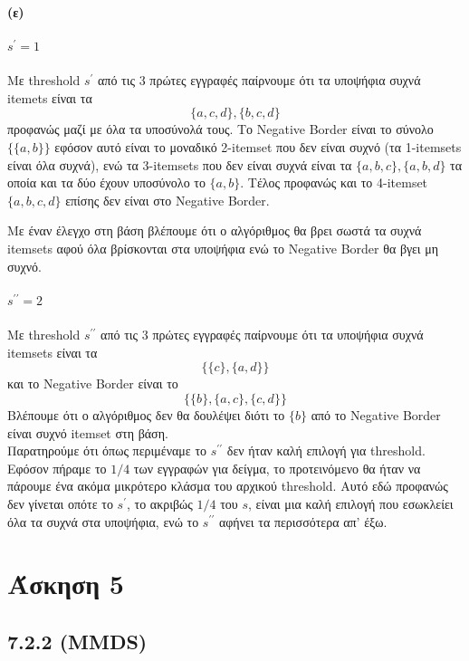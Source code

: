 \documentclass[a4paper,11pt]{article}
\begin{document}
\paragraph{(ε)}
\subparagraph{$s^\prime=1$} Με threshold $s^\prime$ από τις 3 πρώτες εγγραφές παίρνουμε ότι τα υποψήφια συχνά itemets είναι τα
\[ \{a,c,d\},\{b,c,d\} \]
προφανώς μαζί με όλα τα υποσύνολά τους.
Το Negative Border είναι το σύνολο $\{ \{a,b\} \}$ εφόσον αυτό είναι το μοναδικό 2-itemset που δεν είναι συχνό (τα 1-itemsets είναι όλα συχνά), ενώ τα 3-itemsets που δεν είναι συχνά είναι τα $\{a,b,c\},\{a,b,d\}$ τα οποία και τα δύο έχουν υποσύνολο το $\{a,b\}$.
Τέλος προφανώς και το 4-itemset $\{a,b,c,d\}$ επίσης δεν είναι στο Negative Border.

Με έναν έλεγχο στη βάση βλέπουμε ότι ο αλγόριθμος θα βρει σωστά τα συχνά itemsets αφού όλα βρίσκονται στα υποψήφια ενώ το Negative Border θα βγει μη συχνό.

\subparagraph{$s^{\prime\prime}=2$} Με threshold $s^{\prime\prime}$ από τις 3 πρώτες εγγραφές παίρνουμε ότι τα υποψήφια συχνά itemsets είναι τα
\[ \{ \{c\},\{a,d\} \} \]
και το Negative Border είναι το
\[ \{ \{b\},\{a,c\},\{c,d\} \} \]
Βλέπουμε ότι ο αλγόριθμος δεν θα δουλέψει διότι το $\{b\}$ από το Negative Border είναι συχνό itemset στη βάση.
\\[8pt]
Παρατηρούμε ότι όπως περιμέναμε το $s^{\prime\prime}$ δεν ήταν καλή επιλογή για threshold.
Εφόσον πήραμε το $1/4$ των εγγραφών για δείγμα, το προτεινόμενο θα ήταν να πάρουμε ένα ακόμα μικρότερο κλάσμα του αρχικού threshold.
Αυτό εδώ προφανώς δεν γίνεται οπότε το $s^\prime$, το ακριβώς $1/4$ του $s$, είναι μια καλή επιλογή που εσωκλείει όλα τα συχνά στα υποψήφια, ενώ το $s^{\prime\prime}$ αφήνει τα περισσότερα απ' έξω.

\section*{Άσκηση 5}

\subsection*{7.2.2 (MMDS)}
\end{document}
